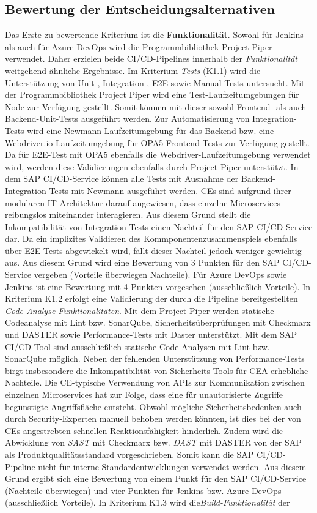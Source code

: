 \subsection{Bewertung der Entscheidungsalternativen}
\label{sec:Bewertung}
Das Erste zu bewertende Kriterium ist die \textbf{Funktionalität}. Sowohl für Jenkins als auch für Azure DevOps wird die Programmbibliothek Project Piper verwendet. Daher erzielen beide CI/CD-Pipelines innerhalb der \textit{Funktionalität} weitgehend ähnliche Ergebnisse.
Im Kriterium \textit{Tests} (K1.1) wird die Unterstützung von Unit-, Integration-, E2E sowie Manual-Tests untersucht. Mit der Programmbibliothek Project Piper wird eine Test-Laufzeitumgebungen für Node zur Verfügung gestellt. Somit können mit dieser sowohl Frontend- als auch Backend-Unit-Tests ausgeführt werden. Zur Automatisierung von Integration-Tests wird eine Newmann-Laufzeitumgebung für das Backend bzw. eine Webdriver.io-Laufzeitumgebung für OPA5-Frontend-Tests zur Verfügung gestellt. Da für E2E-Test mit OPA5 ebenfalls die Webdriver-Laufzeitumgebung verwendet wird, werden diese Validierungen ebenfalls durch Project Piper unterstützt. In dem SAP CI/CD-Service können alle Tests mit Ausnahme der Backend-Integration-Tests mit Newmann ausgeführt werden. CEs sind aufgrund ihrer modularen IT-Architektur darauf angewiesen, dass einzelne Microservices reibungslos miteinander interagieren. Aus diesem Grund stellt die Inkompatibilität von Integration-Tests einen Nachteil für den SAP CI/CD-Service dar. Da ein implizites Validieren des Kommponentenzusammenspiels ebenfalls über E2E-Tests abgewickelt wird, fällt dieser Nachteil jedoch weniger gewichtig aus. Aus diesem Grund wird eine Bewertung von 3 Punkten für den SAP CI/CD-Service vergeben (Vorteile überwiegen Nachteile). Für Azure DevOps sowie Jenkins ist eine Bewertung mit 4 Punkten vorgesehen (ausschließlich Vorteile). In Kriterium K1.2 erfolgt eine Validierung der durch die Pipeline bereitgestellten \textit{Code-Analyse-Funktionalitäten}. Mit dem Project Piper werden statische Codeanalyse mit Lint bzw. SonarQube, Sicherheitsüberprüfungen mit Checkmarx und DASTER sowie Performance-Tests mit Daster unterstützt. Mit dem SAP CI/CD-Tool sind ausschließlich statische Code-Analysen mit Lint bzw. SonarQube möglich. Neben der fehlenden Unterstützung von Performance-Tests birgt insbesondere die Inkompatibilität von Sicherheits-Tools für CEA erhebliche Nachteile. Die CE-typische Verwendung von APIs zur Kommunikation zwischen einzelnen Microservices hat zur Folge, dass eine für unautorisierte Zugriffe begünstigte Angriffsfläche entsteht. Obwohl mögliche Sicherheitsbedenken auch durch Security-Experten manuell behoben werden könnten, ist dies bei der von CEs angestrebten schnellen Reaktionsfähigkeit hinderlich. Zudem wird die Abwicklung von \textit{\ac{SAST}} mit Checkmarx bzw. \textit{\ac{DAST}} mit DASTER von der SAP als Produktqualitätsstandard vorgeschrieben. Somit kann die SAP CI/CD-Pipeline nicht für interne Standardentwicklungen verwendet werden. Aus diesem Grund ergibt sich eine Bewertung von einem Punkt für den SAP CI/CD-Service (Nachteile überwiegen) und vier Punkten für Jenkins bzw. Azure DevOps (ausschließlich Vorteile). In Kriterium K1.3 wird die\textit{Build-Funktionalität} der 